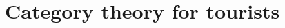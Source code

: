 \documentclass[aps,twocolumn]{revtex4}
\begin{document}
\section{Category theory for tourists}
%
%
%
%
%
%
%
%
%
%
%
\end{document}
